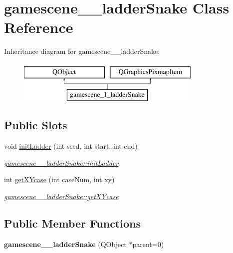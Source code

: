 \hypertarget{classgamescene__1__ladderSnake}{\section{gamescene\-\_\-\_\-ladder\-Snake Class Reference}
\label{classgamescene__1__ladderSnake}
}
Inheritance diagram for gamescene\-\_\-\_\-ladder\-Snake\-:\begin{figure}[H]
\begin{center}
\leavevmode
\includegraphics[height=2.000000cm]{classgamescene__1__ladderSnake}
\end{center}
\end{figure}
\subsection*{Public Slots}
\begin{DoxyCompactItemize}
\item 
void \hyperlink{classgamescene__1__ladderSnake_a035cdb1009cf47abbe272ebcffb9ae3a}{init\-Ladder} (int seed, int start, int end)
\begin{DoxyCompactList}\small\item\em \hyperlink{classgamescene__1__ladderSnake_a035cdb1009cf47abbe272ebcffb9ae3a}{gamescene\-\_\-\_\-ladder\-Snake\-::init\-Ladder} \end{DoxyCompactList}\item 
int \hyperlink{classgamescene__1__ladderSnake_a80c04a3bc2387a0760ac5dcc52fc3086}{get\-X\-Ycase} (int case\-Num, int xy)
\begin{DoxyCompactList}\small\item\em \hyperlink{classgamescene__1__ladderSnake_a80c04a3bc2387a0760ac5dcc52fc3086}{gamescene\-\_\-\_\-ladder\-Snake\-::get\-X\-Ycase} \end{DoxyCompactList}\end{DoxyCompactItemize}
\subsection*{Public Member Functions}
\begin{DoxyCompactItemize}
\item 
\hypertarget{classgamescene__1__ladderSnake_ae38ad9fce246708c2229806145421ed3}{{\bfseries gamescene\-\_\-\_\-ladder\-Snake} (Q\-Object $\ast$parent=0)}\label{classgamescene__1__ladderSnake_ae38ad9fce246708c2229806145421ed3}

\end{DoxyCompactItemize}
